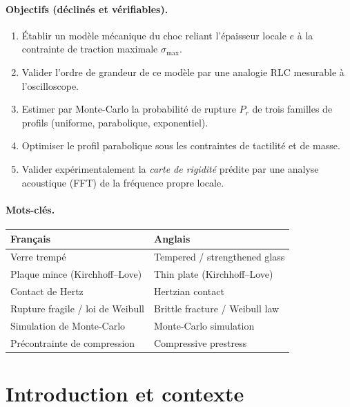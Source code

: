 \documentclass[11pt,a4paper]{article}
\begin{document}
\paragraph{Objectifs (déclinés et vérifiables).}
\begin{enumerate}[leftmargin=2em,itemsep=1pt]
  \item Établir un modèle mécanique du choc reliant l'épaisseur locale $e$ à
        la contrainte de traction maximale $\sigma_{\max}$.
  \item Valider l'ordre de grandeur de ce modèle par une analogie RLC mesurable
        à l'oscilloscope.
  \item Estimer par Monte-Carlo la probabilité de rupture $P_r$ de trois
        familles de profils (uniforme, parabolique, exponentiel).
  \item Optimiser le profil parabolique sous les contraintes de tactilité et de
        masse.
  \item Valider expérimentalement la \emph{carte de rigidité} prédite par une
        analyse acoustique (FFT) de la fréquence propre locale.
\end{enumerate}

\paragraph{Mots-clés.}
\begin{center}\small
\begin{tabular}{ll}
\toprule
\textbf{Français} & \textbf{Anglais} \\
\midrule
Verre trempé & Tempered / strengthened glass \\
Plaque mince (Kirchhoff--Love) & Thin plate (Kirchhoff--Love) \\
Contact de Hertz & Hertzian contact \\
Rupture fragile / loi de Weibull & Brittle fracture / Weibull law \\
Simulation de Monte-Carlo & Monte-Carlo simulation \\
Précontrainte de compression & Compressive prestress \\
\bottomrule
\end{tabular}
\end{center}

\section{Introduction et contexte}
\end{document}
